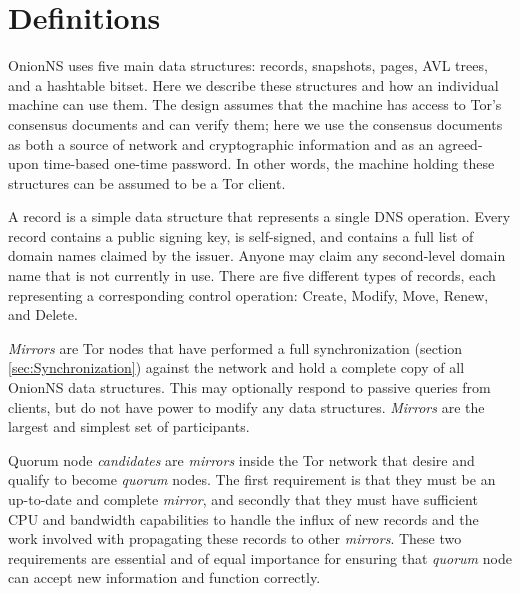 
\section{Definitions}

OnionNS uses five main data structures: records, snapshots, pages, AVL trees, and a hashtable bitset. Here we describe these structures and how an individual machine can use them. The design assumes that the machine has access to Tor's consensus documents and can verify them; here we use the consensus documents as both a source of network and cryptographic information and as an agreed-upon time-based one-time password. In other words, the machine holding these structures can be assumed to be a Tor client.

A record is a simple data structure that represents a single DNS operation. Every record contains a public signing key, is self-signed, and contains a full list of domain names claimed by the issuer. Anyone may claim any second-level domain name that is not currently in use. There are five different types of records, each representing a corresponding control operation: Create, Modify, Move, Renew, and Delete.

\emph{Mirrors} are Tor nodes that have performed a full synchronization (section \ref{sec:Synchronization}) against the network and hold a complete copy of all OnionNS data structures. This may optionally respond to passive queries from clients, but do not have power to modify any data structures. \emph{Mirrors} are the largest and simplest set of participants.

Quorum node \emph{candidates} are \emph{mirrors} inside the Tor network that desire and qualify to become \emph{quorum} nodes. The first requirement is that they must be an up-to-date and complete \emph{mirror}, and secondly that they must have sufficient CPU and bandwidth capabilities to handle the influx of new records and the work involved with propagating these records to other \emph{mirrors}. These two requirements are essential and of equal importance for ensuring that \emph{quorum} node can accept new information and function correctly.


